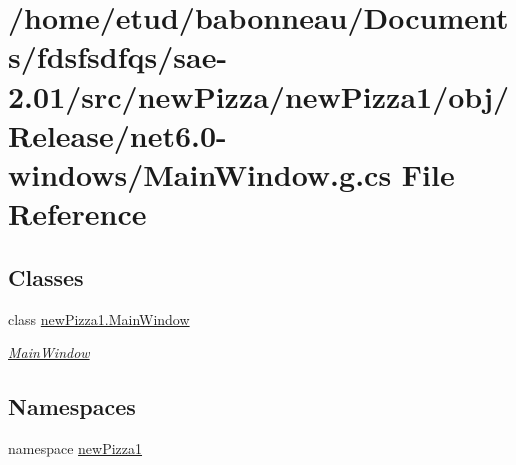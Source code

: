\hypertarget{Release_2net6_80-windows_2MainWindow_8g_8cs}{}\section{/home/etud/babonneau/\+Documents/fdsfsdfqs/sae-\/2.01/src/new\+Pizza/new\+Pizza1/obj/\+Release/net6.0-\/windows/\+Main\+Window.g.\+cs File Reference}
\label{Release_2net6_80-windows_2MainWindow_8g_8cs}
\subsection*{Classes}
\begin{DoxyCompactItemize}
\item 
class \hyperlink{classnewPizza1_1_1MainWindow}{new\+Pizza1.\+Main\+Window}
\begin{DoxyCompactList}\small\item\em \hyperlink{classnewPizza1_1_1MainWindow}{Main\+Window} \end{DoxyCompactList}\end{DoxyCompactItemize}
\subsection*{Namespaces}
\begin{DoxyCompactItemize}
\item 
namespace \hyperlink{namespacenewPizza1}{new\+Pizza1}
\end{DoxyCompactItemize}
